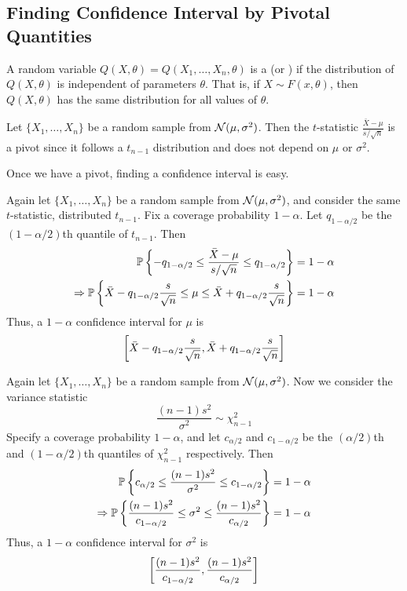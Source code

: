 \documentclass[10pt]{article}
\begin{document}
\subsection{Finding Confidence Interval by Pivotal Quantities}

\begin{definition}
	A random variable $Q(X,\theta) = Q(X_1,\dots,X_n,\theta)$ is a  (or ) if the distribution of $Q(X,\theta)$ is independent of parameters $\theta$. That is, if $X \sim F(x,\theta)$, then $Q(X,\theta)$ has the same distribution for all values of $\theta$. 
\end{definition}

\begin{example}
	Let $\{X_1,\dots,X_n\}$ be a random sample from $\mathcal{N}(\mu,\sigma^2)$. Then the $t$-statistic $\frac{\bar{X}-\mu}{s / \sqrt{n}}$ is a pivot since it follows a $t_{n-1}$ distribution and does not depend on $\mu$ or $\sigma^2$. 
\end{example}

\begin{remark}
	Once we have a pivot, finding a confidence interval is easy.
\end{remark}

\begin{example}
	Again let $\{X_1,\dots,X_n\}$ be a random sample from $\mathcal{N}(\mu,\sigma^2)$, and consider the same $t$-statistic, distributed $t_{n-1}$. Fix a coverage probability $1-\alpha$. Let $q_{1-\alpha / 2}$ be the $(1 - \alpha / 2)$th quantile of $t_{n-1}$. Then
	\begin{align*}
		\mathbb{P}\left\{ -q_{1-\alpha / 2} \le \frac{\bar{X}-\mu}{s / \sqrt{n}} \le q_{1-\alpha / 2}\right\} &= 1-\alpha \\
		\Rightarrow \mathbb{P} \left\{ \bar{X} - q_{1-\alpha / 2} \frac{s}{\sqrt{n}} \le \mu \le \bar{X} + q_{1-\alpha / 2} \frac{s}{\sqrt{n}}\right\} &= 1-\alpha
	\end{align*}
	Thus, a $1-\alpha$ confidence interval for $\mu$ is 
	\[
	\left[  \bar{X} - q_{1-\alpha / 2} \frac{s}{\sqrt{n}},  \bar{X} + q_{1-\alpha / 2} \frac{s}{\sqrt{n}}\right]
	\]
\end{example}

\begin{example}
	Again let $\{X_1,\dots,X_n\}$ be a random sample from $\mathcal{N}(\mu,\sigma^2)$. Now we consider the variance statistic
	\[
	\frac{(n-1)s^2}{\sigma^2} \sim \chi^2_{n-1}
	\]
	Specify a coverage probability $1-\alpha$, and let $c_{\alpha/2}$ and $c_{1 - \alpha / 2}$ be the $(\alpha / 2)$th and $(1- \alpha / 2)$th quantiles of $\chi^2_{n-1}$ respectively. Then 
	\begin{align*}
		\mathbb{P}\left\{ c_{\alpha/2} \le\frac{(n-1)s^2}{\sigma^2} \le c_{1 - \alpha / 2}\right\} &= 1-\alpha \\
		\Rightarrow \mathbb{P} \left\{ \frac{(n-1)s^2}{c_{1-\alpha / 2}} \le \sigma^2 \le \frac{(n-1)s^2}{c_{\alpha / 2}} \right\} &= 1-\alpha 
	\end{align*}
	Thus, a $1-\alpha$ confidence interval for $\sigma^2$ is
	\[
	\left[ \frac{(n-1)s^2}{c_{1-\alpha / 2}}, \frac{(n-1)s^2}{c_{\alpha / 2}}\right]
	\]
\end{example}
\end{document}

